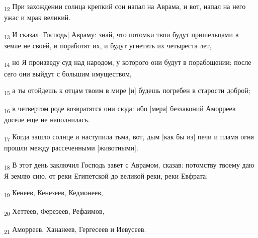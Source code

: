 \begin{tcolorbox}
\textsubscript{12} При захождении солнца крепкий сон напал на Аврама, и вот, напал на него ужас и мрак великий.
\end{tcolorbox}
\begin{tcolorbox}
\textsubscript{13} И сказал [Господь] Авраму: знай, что потомки твои будут пришельцами в земле не своей, и поработят их, и будут угнетать их четыреста лет,
\end{tcolorbox}
\begin{tcolorbox}
\textsubscript{14} но Я произведу суд над народом, у которого они будут в порабощении; после сего они выйдут с большим имуществом,
\end{tcolorbox}
\begin{tcolorbox}
\textsubscript{15} а ты отойдешь к отцам твоим в мире [и] будешь погребен в старости доброй;
\end{tcolorbox}
\begin{tcolorbox}
\textsubscript{16} в четвертом роде возвратятся они сюда: ибо [мера] беззаконий Аморреев доселе еще не наполнилась.
\end{tcolorbox}
\begin{tcolorbox}
\textsubscript{17} Когда зашло солнце и наступила тьма, вот, дым [как бы из] печи и пламя огня прошли между рассеченными [животными].
\end{tcolorbox}
\begin{tcolorbox}
\textsubscript{18} В этот день заключил Господь завет с Аврамом, сказав: потомству твоему даю Я землю сию, от реки Египетской до великой реки, реки Евфрата:
\end{tcolorbox}
\begin{tcolorbox}
\textsubscript{19} Кенеев, Кенезеев, Кедмонеев,
\end{tcolorbox}
\begin{tcolorbox}
\textsubscript{20} Хеттеев, Ферезеев, Рефаимов,
\end{tcolorbox}
\begin{tcolorbox}
\textsubscript{21} Аморреев, Хананеев, Гергесеев и Иевусеев.
\end{tcolorbox}
